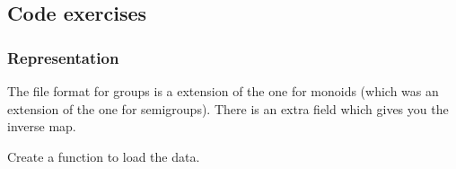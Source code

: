 \subsection{Code exercises}



\subsubsection*{Representation}
The file format for groups is a extension of the one for monoids (which was an extension of the one for semigroups).
There is an extra field  which gives you the inverse map.


\begin{codeexercise}
    Create a function to load the data.
%
\end{codeexercise}


